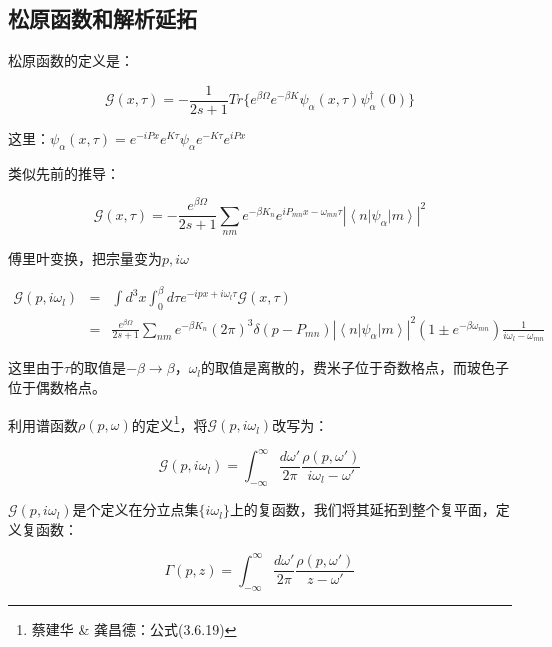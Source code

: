 \subsection{松原函数和解析延拓}

松原函数的定义是：

\begin{equation}
\mathcal{G} (x, \tau) = -\frac{1}{2s+1} Tr \{ e^{\beta \Omega} e^{- \beta K } \psi_{\alpha} (x,\tau) \psi_{\alpha}^\dagger (0)  \}  
\end{equation}

这里：$\psi_{\alpha}(x,\tau) = e^{-i P x } e^{K \tau} \psi_{\alpha}  e^{- K \tau} e^{i P x} $

类似先前的推导：

\begin{equation}
\mathcal{G}(x,\tau) = -\frac{ e^{\beta \Omega} }{2s+1} \sum\limits_{nm} e^{ - \beta K_n} e^{i P_{mn} x - \omega_{mn} \tau} \left| \left\langle n \right|  \psi_{\alpha} \left| m \right\rangle \right|^2 
\end{equation}

傅里叶变换，把宗量变为$p, i \omega$

\begin{eqnarray*}
\mathcal{G}(p, i \omega_l) &=& \int d^3 x \int_0^{\beta} d \tau e^{ -ipx + i \omega_l \tau } \mathcal{G} (x,\tau)    \\
{} &=& \frac{e^{\beta \Omega}}{ 2s+1 } \sum\limits_{nm} e^{-\beta K_n} (2\pi)^3 \delta(p - P_{mn}) \left| \left\langle n \right| \psi_{\alpha} \left| m \right\rangle  \right|^2 (1 \pm e^{-\beta \omega_{mn}} )\frac{1}{ i \omega_l - \omega_{mn}}
\end{eqnarray*}

这里由于$\tau$的取值是$ - \beta \to \beta$，$\omega_l$的取值是离散的，费米子位于奇数格点，而玻色子位于偶数格点。

利用谱函数$\rho (p, \omega)$的定义\footnote{蔡建华 \& 龚昌德：公式(3.6.19)}，将$\mathcal{G} (p, i \omega_l )$改写为：

\begin{equation}
\mathcal{G}(p, i \omega_l) = \int_{-\infty}^{\infty} \frac{d \omega' }{2 \pi} \frac{\rho(p,\omega')}{ i \omega_l - \omega'}
\end{equation}

$\mathcal{G}(p, i \omega_l)$是个定义在分立点集$\{ i \omega_l  \}$上的复函数，我们将其延拓到整个复平面，定义复函数：

\begin{equation}
\Gamma (p, z) = \int_{-\infty}^{\infty} \frac{d \omega'}{2 \pi} \frac{\rho(p, \omega')}{z - \omega'} 
\end{equation}

